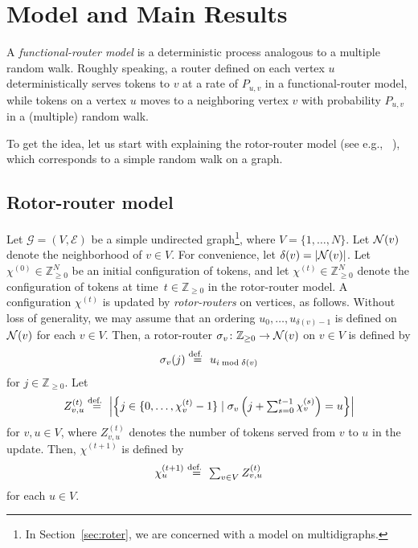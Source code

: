 \documentclass[letter, 11pt]{article}
\newcommand{\defeq}{\stackrel{\mbox{\scriptsize{\normalfont\rmfamily def. }}}{=}}
\newcommand{\1}{\mbox{1}\hspace{-0.25em}\mbox{l}}
\newcommand{\MDG}{\mathcal{G}} \newcommand{\ME}{\mathcal{E}}
\begin{document}
\section{Model and Main Results}\label{sec:modelresult}A {\em functional-router model} is 
   a  deterministic process analogous to a multiple random walk. 
 Roughly speaking, 
  a router defined on each vertex $u$ deterministically serves tokens to $v$ 
  at a rate of $P_{u, v}$ in a functional-router model, 
  while tokens on a vertex $u$ moves to a neighboring vertex $v$ with probability $P_{u, v}$ in a (multiple) random walk.

To get the idea, 
  let us start 
   with explaining the rotor-router model (see e.g., ~\cite{CS06, KKM12}), 
   which corresponds to a simple random walk on a graph. 
\subsection{Rotor-router model}\label{sec:rotor-router}
Let $\MDG=(V, \ME)$ be a simple undirected graph\footnote{
  In Section~\ref{sec:roter}, we are concerned with a model on multidigraphs. 
}, where $V=\{1, \ldots, N\}$. 
 Let ${\cal N}(v)$ denote 
  the neighborhood of $v \in V$. 
 For convenience, 
  let $\delta(v)=|{\cal N}(v)|$. 
 Let $\chi^{(0)} \in \mathbb{Z}_{\geq 0}^{N}$ be an initial configuration of tokens, and  
 let $\chi^{(t)} \in \mathbb{Z}_{\geq 0}^{N}$ denote the configuration of tokens 
   at time~$t \in \mathbb{Z}_{\geq 0}$ in the rotor-router model. 
 A configuration $\chi^{(t)}$ 
   is updated by {\em rotor-routers} on vertices, as follows. 
 Without loss of generality, 
   we may assume that an ordering $u_0, \ldots, u_{\delta(v)-1}$ is defined on ${\cal N}(v)$ for each $v \in V$. 
 Then, a rotor-router $\sigma_v \colon \mathbb{Z}_{\geq 0} \to {\cal N}(v)$ on $v \in V$ is defined by 
\begin{eqnarray}
\sigma_v(j) \defeq u_{i \bmod \delta(v)}
\label{def]rotor}
\end{eqnarray}
 for $j \in \mathbb{Z}_{\geq 0}$. 
 Let
\begin{eqnarray*}
 Z_{v, u}^{(t)} \defeq 
 \left| \left\{j \in \{0, \ldots, \chi^{(t)}_{v}-1 \} 
 \mid  \sigma_v \left(  j + \textstyle\sum_{s=0}^{t-1} \chi^{(s)}_v \right) = u \right\} \right|
\end{eqnarray*}
  for $v, u \in V$, 
 where $Z_{v, u}^{(t)}$ denotes the number of tokens served from $v$ to $u$ in the update. 
 Then, $\chi^{(t+1)}$ is defined by 
\begin{eqnarray*}\textstyle
 \chi_u^{(t+1)} 
  \defeq \sum_{v \in V} Z_{v, u}^{(t)}
\end{eqnarray*}
  for each $u \in V$. 
\end{document}
